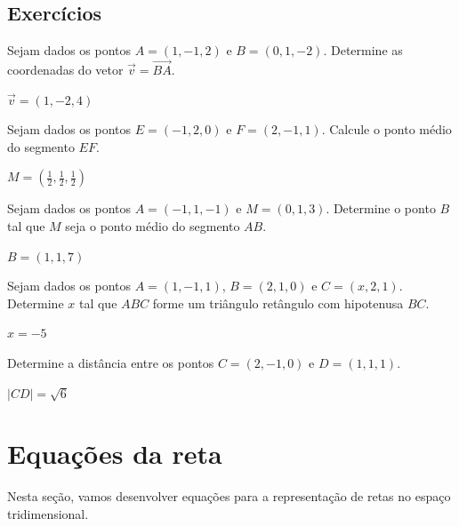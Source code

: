 \subsection*{Exercícios}

\begin{exer}
  Sejam dados os pontos $A=(1,-1,2)$ e $B=(0,1,-2)$. Determine as coordenadas do vetor $\vec{v}=\overrightarrow{BA}$.
\end{exer}
\begin{resp}
  $\vec{v}=(1,-2,4)$
\end{resp}

\begin{exer}
  Sejam dados os pontos $E=(-1,2,0)$ e $F=(2,-1,1)$. Calcule o ponto médio do segmento $EF$.
\end{exer}
\begin{resp}
  $\displaystyle M=\left(\frac{1}{2},\frac{1}{2},\frac{1}{2}\right)$
\end{resp}

\begin{exer}
  Sejam dados os pontos $A=(-1,1,-1)$ e $M=(0,1,3)$. Determine o ponto $B$ tal que $M$ seja o ponto médio do segmento $AB$.
\end{exer}
\begin{resp}
  $B=(1,1,7)$
\end{resp}

\begin{exer}
  Sejam dados os pontos $A=(1,-1,1)$, $B=(2,1,0)$ e $C=(x,2,1)$. Determine $x$ tal que $ABC$ forme um triângulo retângulo com hipotenusa $BC$.
\end{exer}
\begin{resp}
  $x=-5$
\end{resp}

\begin{exer}
  Determine a distância entre os pontos $C=(2,-1,0)$ e $D=(1,1,1)$.
\end{exer}
\begin{resp}
  $|CD|=\sqrt{6}$
\end{resp}

\section{Equações da reta}\label{cap_estudo_sec_eqsreta}
\badgeRevisar

Nesta seção, vamos desenvolver equações para a representação de retas no espaço tridimensional.

